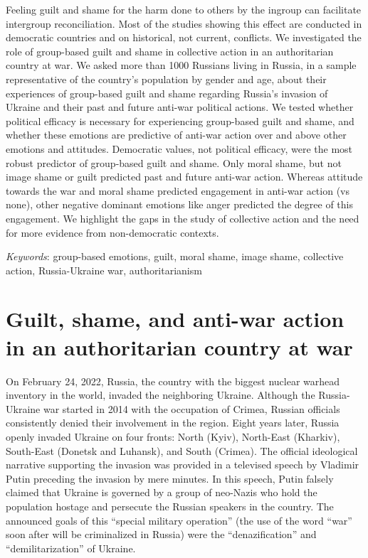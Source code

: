 \documentclass[
]{article}
\begin{document}
Feeling guilt and shame for the harm done to others by the ingroup can facilitate intergroup reconciliation. Most of the studies showing this effect are conducted in democratic countries and on historical, not current, conflicts. We investigated the role of group-based guilt and shame in collective action in an authoritarian country at war. We asked more than 1000 Russians living in Russia, in a sample representative of the country's population by gender and age, about their experiences of group-based guilt and shame regarding Russia's invasion of Ukraine and their past and future anti-war political actions. We tested whether political efficacy is necessary for experiencing group-based guilt and shame, and whether these emotions are predictive of anti-war action over and above other emotions and attitudes. Democratic values, not political efficacy, were the most robust predictor of group-based guilt and shame. Only moral shame, but not image shame or guilt predicted past and future anti-war action. Whereas attitude towards the war and moral shame predicted engagement in anti-war action (vs none), other negative dominant emotions like anger predicted the degree of this engagement. We highlight the gaps in the study of collective action and the need for more evidence from non-democratic contexts.

\vspace{5mm}

\emph{Keywords}: group-based emotions, guilt, moral shame, image shame, collective action, Russia-Ukraine war, authoritarianism

\section*{Guilt, shame, and anti-war action in an authoritarian country at war}\label{guilt-shame-and-anti-war-action-in-an-authoritarian-country-at-war}

On February 24, 2022, Russia, the country with the biggest nuclear warhead inventory in the world, invaded the neighboring Ukraine. Although the Russia-Ukraine war started in 2014 with the occupation of Crimea, Russian officials consistently denied their involvement in the region. Eight years later, Russia openly invaded Ukraine on four fronts: North (Kyiv), North-East (Kharkiv), South-East (Donetsk and Luhansk), and South (Crimea). The official ideological narrative supporting the invasion was provided in a televised speech by Vladimir Putin preceding the invasion by mere minutes. In this speech, Putin falsely claimed that Ukraine is governed by a group of neo-Nazis who hold the population hostage and persecute the Russian speakers in the country. The announced goals of this ``special military operation'' (the use of the word ``war'' soon after will be criminalized in Russia) were the ``denazification'' and ``demilitarization'' of Ukraine.
\end{document}
